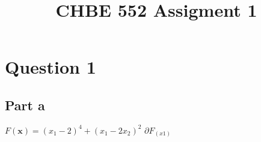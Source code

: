 \documentclass[a4paper,12pt]{article} %
\begin{document}
\setlength{\parskip}{1em} 
\setlength{\parindent}{0pt}
\newcommand{\vect}[1]{\mathbf{#1}}

\title{CHBE 552 Assigment 1}

\section{\textbf{Question 1}}

\subsection{Part a}
$ F( \vect{x} )= (x_1 - 2)^4 + (x_1-2x_2)^2 $
$ \partial F_(x1) $
\end{document}
